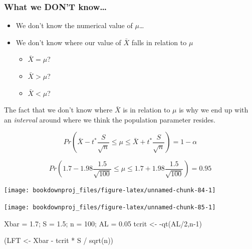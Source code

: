 \documentclass[
]{book}
\newenvironment{Shaded}{\begin{snugshade}}{\end{snugshade}}
\newcommand{\DecValTok}[1]{\textcolor[rgb]{0.00,0.00,0.81}{#1}}
\newcommand{\FloatTok}[1]{\textcolor[rgb]{0.00,0.00,0.81}{#1}}
\newcommand{\FunctionTok}[1]{\textcolor[rgb]{0.00,0.00,0.00}{#1}}
\newcommand{\NormalTok}[1]{#1}
\newcommand{\OtherTok}[1]{\textcolor[rgb]{0.56,0.35,0.01}{#1}}
\newcommand{\SpecialCharTok}[1]{\textcolor[rgb]{0.00,0.00,0.00}{#1}}
\begin{document}
\hypertarget{what-we-dont-know}{%
\subsubsection*{What we DON'T know\ldots{}}\label{what-we-dont-know}}

\begin{itemize}
\item
  We don't know the numerical value of \(\mu\)\ldots{}
\item
  We don't know where our value of \(\bar{X}\) falls in relation to \(\mu\)

  \begin{itemize}
  \item
    \(\bar{X}=\mu\)?
  \item
    \(\bar{X}>\mu\)?
  \item
    \(\bar{X}<\mu\)?
  \end{itemize}
\end{itemize}

The fact that we don't know where \(\bar{X}\) is in relation to \(\mu\) is why we end up with an \emph{interval} around where we think the population parameter resides.

\[Pr(\bar{X}-t^* \frac{S}{\sqrt{n}} \leq \mu \leq \bar{X}+t^* \frac{S}{\sqrt{n}}) = 1-\alpha\]

\[Pr(1.7-1.98 \frac{1.5}{\sqrt{100}} \leq \mu \leq 1.7+1.98 \frac{1.5}{\sqrt{100}}) = 0.95\]

\begin{center}\texttt{[image: bookdownproj\_files/figure-latex/unnamed-chunk-84-1]} \end{center}

\begin{center}\texttt{[image: bookdownproj\_files/figure-latex/unnamed-chunk-85-1]} \end{center}

\begin{Shaded}
\begin{Highlighting}[]
\NormalTok{Xbar }\OtherTok{=} \FloatTok{1.7}\NormalTok{; S }\OtherTok{=} \FloatTok{1.5}\NormalTok{; n }\OtherTok{=} \DecValTok{100}\NormalTok{; AL }\OtherTok{=} \FloatTok{0.05}
\NormalTok{tcrit }\OtherTok{\textless{}{-}} \SpecialCharTok{{-}}\FunctionTok{qt}\NormalTok{(AL}\SpecialCharTok{/}\DecValTok{2}\NormalTok{,n}\DecValTok{{-}1}\NormalTok{)}

\NormalTok{(LFT }\OtherTok{\textless{}{-}}\NormalTok{ Xbar }\SpecialCharTok{{-}}\NormalTok{ tcrit }\SpecialCharTok{*}\NormalTok{ S }\SpecialCharTok{/} \FunctionTok{sqrt}\NormalTok{(n))}
\end{Highlighting}
\end{Shaded}
\end{document}
